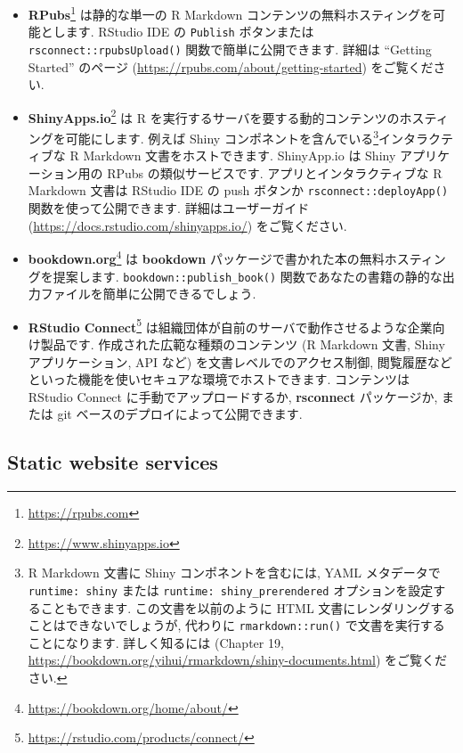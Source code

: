 \documentclass[
  11pt,
  lualatex,ja=standard,jafont=noto]{bxjsreport}
\renewcommand{\href}[2]{#2\footnote{\url{#1}}}
\begin{document}
\begin{itemize}
\item
  \href{https://rpubs.com}{\textbf{RPubs}} は静的な単一の R Markdown コンテンツの無料ホスティングを可能とします. RStudio IDE の \texttt{Publish} ボタンまたは \texttt{rsconnect::rpubsUpload()} 関数で簡単に公開できます. 詳細は ``Getting Started'' のページ (\url{https://rpubs.com/about/getting-started}) をご覧ください.
\item
  \href{https://www.shinyapps.io}{\textbf{ShinyApps.io}} は R を実行するサーバを要する動的コンテンツのホスティングを可能にします. 例えば Shiny コンポネントを含んでいる\footnote{R Markdown 文書に Shiny コンポネントを含むには, YAML メタデータで \texttt{runtime: shiny} または \texttt{runtime: shiny\_prerendered} オプションを設定することもできます. この文書を以前のように HTML 文書にレンダリングすることはできないでしょうが, 代わりに \texttt{rmarkdown::run()} で文書を実行することになります. 詳しく知るには \textcite{rmarkdown2018} (Chapter 19, \url{https://bookdown.org/yihui/rmarkdown/shiny-documents.html}) をご覧ください.}インタラクティブな R Markdown 文書をホストできます. ShinyApp.io は Shiny アプリケーション用の RPubs の類似サービスです. アプリとインタラクティブな R Markdown 文書は RStudio IDE の push ボタンか \texttt{rsconnect::deployApp()} 関数を使って公開できます. 詳細はユーザーガイド (\url{https://docs.rstudio.com/shinyapps.io/}) をご覧ください.
\item
  \href{https://bookdown.org/home/about/}{\textbf{bookdown.org}} は \textbf{bookdown} パッケージで書かれた本の無料ホスティングを提案します. \texttt{bookdown::publish\_book()} 関数であなたの書籍の静的な出力ファイルを簡単に公開できるでしょう.
\item
  \href{https://rstudio.com/products/connect/}{\textbf{RStudio Connect}} は組織団体が自前のサーバで動作させるような企業向け製品です. 作成された広範な種類のコンテンツ (R Markdown 文書, Shiny アプリケーション, API など) を文書レベルでのアクセス制御, 閲覧履歴などといった機能を使いセキュアな環境でホストできます. コンテンツは RStudio Connect に手動でアップロードするか, \textbf{rsconnect} パッケージか, または git ベースのデプロイによって公開できます.
\end{itemize}

\hypertarget{static-website-services}{%
\subsection{Static website services}\label{static-website-services}}
\end{document}
